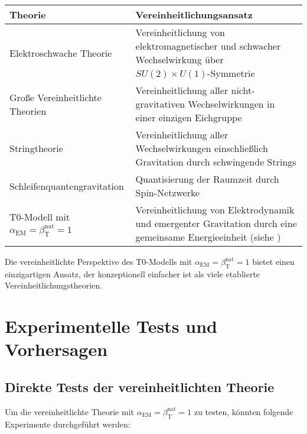 \documentclass[12pt,a4paper]{article}
\newcommand{\alphaEM}{\alpha_{\text{EM}}}
\newcommand{\betaT}{\beta_{\text{T}}}
\begin{document}
	\begin{tcolorbox}[colback=blue!5!white,colframe=blue!75!black,title=Vergleich mit anderen Vereinheitlichungstheorien]
		\begin{tabular}{>{\raggedright\arraybackslash}p{3cm}|>{\raggedright\arraybackslash}p{8cm}}
			\textbf{Theorie} & \textbf{Vereinheitlichungsansatz} \\
			\hline
			Elektroschwache Theorie & Vereinheitlichung von elektromagnetischer und schwacher Wechselwirkung über \(SU(2) \times U(1)\)-Symmetrie \\
			\hline
			Große Vereinheitlichte Theorien & Vereinheitlichung aller nicht-gravitativen Wechselwirkungen in einer einzigen Eichgruppe \\
			\hline
			Stringtheorie & Vereinheitlichung aller Wechselwirkungen einschließlich Gravitation durch schwingende Strings \\
			\hline
			Schleifenquantengravitation & Quantisierung der Raumzeit durch Spin-Netzwerke \\
			\hline
			T0-Modell mit \(\alphaEM = \betaT^{\text{nat}} = 1\) & Vereinheitlichung von Elektrodynamik und emergenter Gravitation durch eine gemeinsame Energieeinheit (siehe \cite{pascher_emergente_gravitation_2025}) \\
		\end{tabular}
	\end{tcolorbox}
	
	Die vereinheitlichte Perspektive des T0-Modells mit \(\alphaEM = \betaT^{\text{nat}} = 1\) bietet einen einzigartigen Ansatz, der konzeptionell einfacher ist als viele etablierte Vereinheitlichungstheorien.
	
	\section{Experimentelle Tests und Vorhersagen}
	\label{sec:experiments}
	
	\subsection{Direkte Tests der vereinheitlichten Theorie}
	\label{subsec:direct_tests}
	
	Um die vereinheitlichte Theorie mit \(\alphaEM = \betaT^{\text{nat}} = 1\) zu testen, könnten folgende Experimente durchgeführt werden:
	
\end{document}
